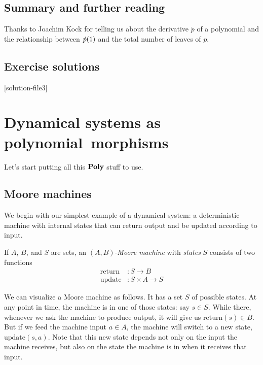 \documentclass[Book-Poly]{subfiles}
\begin{document}
\section{Summary and further reading}

Thanks to Joachim Kock for telling us about the derivative $\dot{p}$ of a polynomial and the relationship between $\dot{p}(\textsf{1})$ and the total number of leaves of $p$.

\section{Exercise solutions}
{\footnotesize
}

[solution-file3]

\chapter{Dynamical systems as polynomial~morphisms} \label{ch.poly.dyn_sys}

Let's start putting all this $\mathbf{Poly}$ stuff to use. 

\section{Moore machines}\label{sec.poly.dyn_sys.moore}

We begin with our simplest example of a dynamical system: a deterministic machine with internal states that can return output and be updated according to input.

\begin{definition}\label{def.moore_machine}
If $A$, $B$, and $S$ are sets, an $(A,B)$-\emph{Moore machine} with \emph{states} $S$ consists of two functions
\begin{align*}
	\text{return}&\colon S\to B\\
	\text{update}&\colon S\times A\to S 
\end{align*}
\end{definition}

We can visualize a Moore machine as follows.
It has a set $S$ of possible states.
At any point in time, the machine is in one of those states: say $s \in S$.
While there, whenever we ask the machine to produce output, it will give us $\text{return}(s) \in B$.
But if we feed the machine input $a \in A$, the machine will switch to a new state, $\text{update}(s, a)$.
Note that this new state depends not only on the input the machine receives, but also on the state the machine is in when it receives that input.
\end{document}
